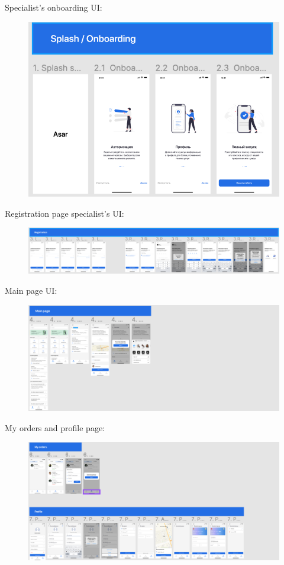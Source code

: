 Specialist’s onboarding UI:
\begin{figure}[H]
    \centering
    \includegraphics[scale=1.4]{images/design8.png}
\end{figure}
Registration page specialist’s UI:
\begin{figure}[H]
    \centering
    \includegraphics[scale=0.73]{images/design9.png}
\end{figure}
Main page UI:
\begin{figure}[H]
    \centering
    \includegraphics[scale=0.96]{images/design11.png}
\end{figure}
My orders and profile page:
\begin{figure}[H]
    \centering
    \includegraphics[scale=0.85]{images/design12.png}
\end{figure}
